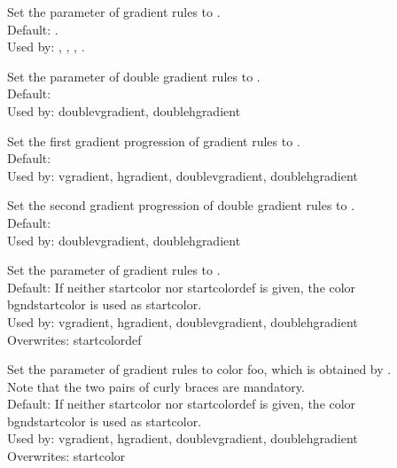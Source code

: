 \documentclass[12pt]{scrartcl}
\begin{document}
  \begin{description}
  \item[] Set the 
    parameter of gradient rules to .\\
    Default: . \\
    Used by: , , ,
    .

  \item[] Set the 
    parameter of double gradient rules to .\\
    Default: \\
    Used by: doublevgradient, doublehgradient

  \item[]
    Set the first gradient progression of gradient rules to .\\
    Default: \\
    Used by: vgradient, hgradient, doublevgradient, doublehgradient

  \item[]
    Set the second gradient progression of double gradient rules to .\\
    Default: \\
    Used by: doublevgradient, doublehgradient

  \item[]
    Set the  parameter of gradient rules to .\\
    Default: If neither startcolor nor startcolordef is given, the color
      bgndstartcolor is used as startcolor.\\
    Used by: vgradient, hgradient, doublevgradient, doublehgradient\\
    Overwrites: startcolordef

  \item[]
    Set the  parameter of gradient rules to color foo, which
    is obtained by .
    Note that the two pairs of curly braces are mandatory.\\
    Default: If neither startcolor nor startcolordef is given, the color
      bgndstartcolor is used as startcolor.\\
    Used by: vgradient, hgradient, doublevgradient, doublehgradient\\
    Overwrites: startcolor


\end{description}
\end{document}
